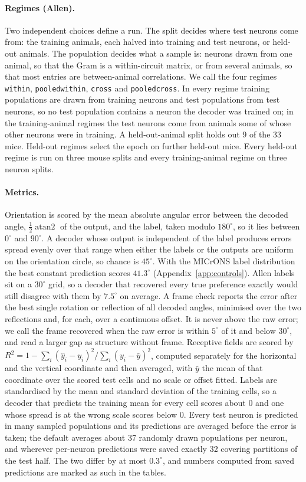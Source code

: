 \documentclass[11pt]{article}
\newcommand{\code}[1]{\texttt{#1}}
\newcommand{\Rsq}{R^{2}}
\begin{document}
\paragraph{Regimes (Allen).} Two independent choices define a run. The split decides where test neurons come from: the training animals, each halved into training and test neurons, or held-out animals. The population decides what a sample is: neurons drawn from one animal, so that the Gram is a within-circuit matrix, or from several animals, so that most entries are between-animal correlations. We call the four regimes \code{within}, \code{pooledwithin}, \code{cross} and \code{pooledcross}. In every regime training populations are drawn from training neurons and test populations from test neurons, so no test population contains a neuron the decoder was trained on; in the training-animal regimes the test neurons come from animals some of whose other neurons were in training. A held-out-animal split holds out 9 of the 33 mice. Held-out regimes select the epoch on further held-out mice. Every held-out regime is run on three mouse splits and every training-animal regime on three neuron splits.

\paragraph{Metrics.} Orientation is scored by the mean absolute angular error between the decoded angle, $\tfrac12\operatorname{atan2}$ of the output, and the label, taken modulo $180^\circ$, so it lies between $0^\circ$ and $90^\circ$. A decoder whose output is independent of the label produces errors spread evenly over that range when either the labels or the outputs are uniform on the orientation circle, so chance is $45^\circ$. With the MICrONS label distribution the best constant prediction scores $41.3^\circ$ (Appendix~\ref{app:controls}). Allen labels sit on a $30^\circ$ grid, so a decoder that recovered every true preference exactly would still disagree with them by $7.5^\circ$ on average. A frame check reports the error after the best single rotation or reflection of all decoded angles, minimised over the two reflections and, for each, over a continuous offset. It is never above the raw error; we call the frame recovered when the raw error is within $5^\circ$ of it and below $30^\circ$, and read a larger gap as structure without frame. Receptive fields are scored by $\Rsq = 1 - \sum_i (\hat{y}_i - y_i)^2 / \sum_i (y_i - \bar{y})^2$, computed separately for the horizontal and the vertical coordinate and then averaged, with $\bar{y}$ the mean of that coordinate over the scored test cells and no scale or offset fitted. Labels are standardised by the mean and standard deviation of the training cells, so a decoder that predicts the training mean for every cell scores about 0 and one whose spread is at the wrong scale scores below 0. Every test neuron is predicted in many sampled populations and its predictions are averaged before the error is taken; the default averages about 37 randomly drawn populations per neuron, and wherever per-neuron predictions were saved exactly 32 covering partitions of the test half. The two differ by at most $0.3^\circ$, and numbers computed from saved predictions are marked as such in the tables.
\end{document}
